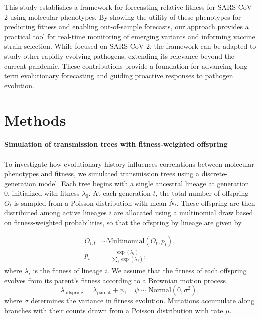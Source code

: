 This study establishes a framework for forecasting relative fitness for SARS-CoV-2 using molecular phenotypes.
By showing the utility of these phenotypes for predicting fitness and enabling out-of-sample forecasts, our approach provides a practical tool for real-time monitoring of emerging variants and informing vaccine strain selection. 
While focused on SARS-CoV-2, the framework can be adapted to study other rapidly evolving pathogens, extending its relevance beyond the current pandemic.
These contributions provide a foundation for advancing long-term evolutionary forecasting and guiding proactive responses to pathogen evolution.

\section{Methods}

\paragraph{Simulation of transmission trees with fitness-weighted offspring}%

To investigate how evolutionary history influences correlations between molecular phenotypes and fitness, we simulated transmission trees using a discrete-generation model.
Each tree begins with a single ancestral lineage at generation 0, initialized with fitness $\lambda_0$.
At each generation $t$, the total number of offspring $O_{t}$ is sampled from a Poisson distribution with mean $\overline{N}_t$.
These offspring are then distributed among active lineages $i$ are allocated using a multinomial draw based on fitness-weighted probabilities, so that the offspring by lineage are given by

\begin{align}
    O_{i, t} &\sim \text{Multinomial}\left(O_t, p_{i}\right),\\
    p_i &= \frac{\exp(\lambda_i)}{\sum_j \exp(\lambda_j)},
\end{align}
where $\lambda_i$ is the fitness of lineage $i$.
We assume that the fitness of each offspring evolves from its parent’s fitness according to a Brownian motion process
\begin{equation}
    \lambda_{\text{offspring}} = \lambda_{\text{parent}} + \psi, \quad \psi \sim \text{Normal}(0, \sigma^2),
\end{equation}
where $\sigma$ determines the variance in fitness evolution.
Mutations accumulate along branches with their counts drawn from a Poisson distribution with rate $\mu$.

